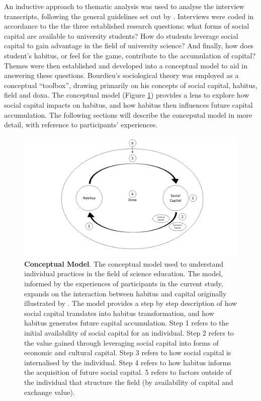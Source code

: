 An inductive approach to thematic analysis was used to analyse the interview transcripts, following the general guidelines set out by \cite{Braun_2006}. Interviews were coded in accordance to the the three established research questions:  what forms of social capital are available to university students? How do students leverage social capital to gain advantage in the field of university science? And finally, how does student's habitus, or feel for the game, contribute to the accumulation of capital? Themes were then established and developed into a conceptual model to aid in answering these questions. Bourdieu's sociological theory was employed as a conceptual ``toolbox'', drawing primarily on his concepts of social capital, habitus, field and doxa. The conceptual model (Figure \ref{fig:HabitusSocCap_TheoreticalModel_C6}) provides a lens to explore how social capital impacts on habitus, and how habitus then influences future capital accumulation. The following sections will describe the conceputal model in more detail, with reference to participants' experiences. 

\begin{figure}[ht]
\centering
\includegraphics[width=\textwidth]{C5 - Understanding Capital Accumulation/HabitusSocCap_TheoreticalModel.png}
\caption{\label{fig:HabitusSocCap_TheoreticalModel_C6}\textbf{Conceptual Model}. The conceptual model used to understand individual practices in the field of science education. The model, informed by the experiences of participants in the current study, expands on the interaction between habitus and capital originally illustrated by \cite{Bourdieu1984}. The model provides a step by step description of how social capital translates into habitus transformation, and how habitus generates future capital accumulation. Step 1 refers to the initial availability of social capital for an individual. Step 2 refers to the value gained through leveraging social capital into forms of economic and cultural capital. Step 3 refers to how social capital is internalised by the individual. Step 4 refers to how habitus informs the acquisition of future social capital. 5 refers to factors outside of the individual that structure the field (by availability of capital and exchange value).}
\end{figure}

